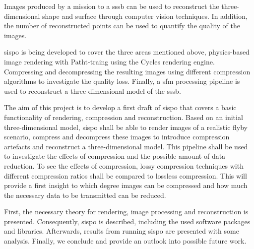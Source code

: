 Images produced by a mission to a \gls{sssb} can be used to reconstruct the three-dimensional shape and surface through computer vision techniques. In addition, the number of reconstructed points can be used to quantify the quality of the images.

\gls{sispo} is being developed to cover the three areas mentioned above, physics-based image rendering with Patht-traing using the Cycles rendering engine. Compressing and decompressing the resulting images using different compression algorithms to investigate the quality loss. Finally, a \gls{sfm} processing pipeline is used to reconstruct a three-dimensional model of the \gls{sssb}.

The aim of this project is to develop a first draft of \gls{sispo} that covers a basic functionality of rendering, compression and reconstruction. Based on an initial three-dimensional model, \gls{sispo} shall be able to render images of a realistic flyby scenario, compress and decompress these images to introduce compression artefacts and reconstruct a three-dimensional model. This pipeline shall be used to investigate the effects of compression and the possible amount of data reduction. To see the effects of compression, lossy compression techniques with different compression ratios shall be compared to lossless compression. This will provide a first insight to which degree images can be compressed and how much the necessary data to be transmitted can be reduced.

First, the necessary theory for rendering, image processing and reconstruction is presented. Consequently, \gls{sispo} is described, including the used software packages and libraries. Afterwards, results from running \gls{sispo} are presented with some analysis. Finally, we conclude and provide an outlook into possible future work.

